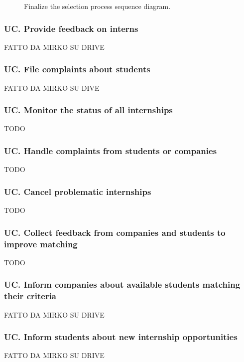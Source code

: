 \begin{figure}[H]
    \begin{center}
        
        \caption{Finalize the selection process sequence diagram.}
        \label{fig:finalize_the_selection_process_seqd}%
    \end{center}
\end{figure}

\subsubsection*{UC\cuc . Provide feedback on interns}
FATTO DA MIRKO SU DRIVE

\subsubsection*{UC\cuc . File complaints about students}
FATTO DA MIRKO SU DIVE

\subsubsection*{UC\cuc . Monitor the status of all internships}
TODO

\subsubsection*{UC\cuc . Handle complaints from students or companies}
TODO

\subsubsection*{UC\cuc . Cancel problematic internships}
TODO

\subsubsection*{UC\cuc . Collect feedback from companies and students to improve matching}
TODO

\subsubsection*{UC\cuc . Inform companies about available students matching their criteria}
FATTO DA MIRKO SU DRIVE

\subsubsection*{UC\cuc . Inform students about new internship opportunities}
FATTO DA MIRKO SU DRIVE

